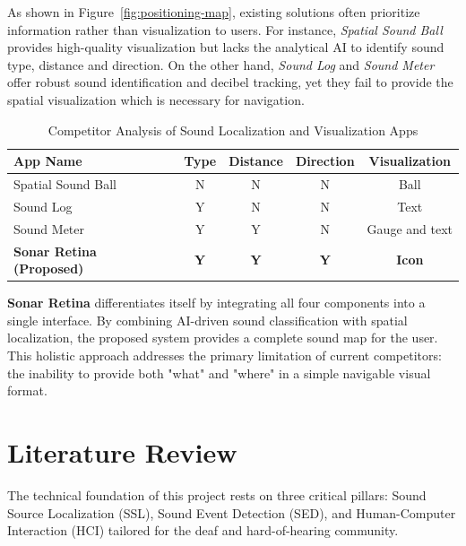 As shown in Figure~\ref{fig:positioning-map}, existing solutions often prioritize information rather than visualization to users. 
For instance, \textit{Spatial Sound Ball} \cite{SpatialSoundBall} provides high-quality visualization but lacks the analytical AI to identify sound type, distance and direction. 
On the other hand, \textit{Sound Log} \cite{SoundLog} and \textit{Sound Meter} \cite{SoundMeter} offer robust sound identification and decibel tracking, yet they fail to provide the spatial visualization which is necessary for navigation.

\begin{table}[h]
\centering
\caption{Competitor Analysis of Sound Localization and Visualization Apps}
\label{tab:competitor-comparison}
\begin{tabular}{|l|c|c|c|c|}
\hline
\textbf{App Name} & \textbf{Type} & \textbf{Distance} & \textbf{Direction} & \textbf{Visualization} \\ \hline
Spatial Sound Ball & N & N & N & Ball \\ \hline
Sound Log & Y & N & N & Text \\ \hline
Sound Meter & Y & Y & N & Gauge and text \\ \hline
\textbf{Sonar Retina (Proposed)} & \textbf{Y} & \textbf{Y} & \textbf{Y} & \textbf{Icon} \\ \hline
\end{tabular}
\end{table}

\textbf{Sonar Retina} differentiates itself by integrating all four components into a single interface. By combining AI-driven sound classification with spatial localization, the proposed system provides a complete sound map for the user. 
This holistic approach addresses the primary limitation of current competitors: the inability to provide both "what" and "where" in a simple navigable visual format.

\section{Literature Review}
\label{section:literature-review}

The technical foundation of this project rests on three critical pillars: Sound Source Localization (SSL), Sound Event Detection (SED), and Human-Computer Interaction (HCI) tailored for the deaf and hard-of-hearing community.

